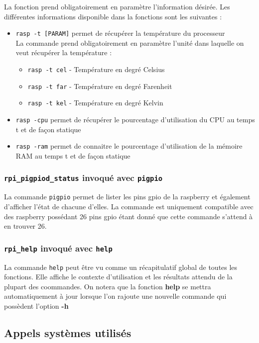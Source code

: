 \documentclass[10pt,a4paper]{article}
\begin{document}
La fonction prend obligatoirement en paramètre l'information désirée. Les différentes informations disponible dans la fonctions sont les suivantes :

\begin{itemize}
\item \texttt{rasp -t [PARAM]} permet de récupérer la température du processeur\\

La commande prend obligatoirement en paramètre l'unité dans laquelle on veut récupérer la température : 
\begin{itemize}
\item \texttt{rasp -t cel} - Température en degré Celsius
\item \texttt{rasp -t far} - Température en degré Farenheit
\item \texttt{rasp -t kel} - Température en degré Kelvin
\end{itemize}

\item \texttt{rasp -cpu} permet de récupérer le pourcentage d'utilisation du CPU au temps t et de façon statique

\item \texttt{rasp -ram} permet de connaitre le pourcentage d'utilisation de la mémoire RAM au temps t et de façon statique
\end{itemize}

\subsubsection{\texttt{rpi\_pigpiod\_status} invoqué avec \texttt{pigpio}}

La commande \texttt{pigpio} permet de lister les pins gpio de la raspberry et également d'afficher l'état de chacune d'elles. La commande est uniquement compatible avec des raspberry possédant 26 pins gpio étant donné que cette commande s'attend à en trouver 26.

\subsubsection{\texttt{rpi\_help} invoqué avec \texttt{help}}
La commande \texttt{help} peut être vu comme un récapitulatif global de toutes les fonctions. Elle affiche le contexte d'utilisation et les résultats attendu de la plupart des coommandes. On notera que la fonction \textbf{help} se mettra automatiquement à jour lorsque l'on rajoute une nouvelle commande qui possèdent l'option \textbf{-h}  
\subsection{Appels systèmes utilisés}
\end{document}
